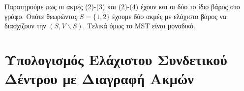 \documentclass[a4paper,10pt]{article}
\begin{document}
\begin{figure}[ht]
	\centering
	\hspace{1cm}
\end{figure}

Παρατηρούμε πως οι ακμές (2)-(3) και (2)-(4) έχουν και οι δύο το ίδιο βάρος
στο γράφο. Οπότε θεωρώντας $S=\{1,2\}$ έχουμε δύο ακμές με ελάχιστο βάρος να
διασχίζουν την $(S, V \backslash S)$. Τελικά όμως το MST είναι μοναδικό.

\subsection{}
\subsection{}


\section{Υπολογισμός Ελάχιστου Συνδετικού Δέντρου με Διαγραφή Ακμών}
\subsection{}
\subsection{}
\subsection{}

\end{document}
